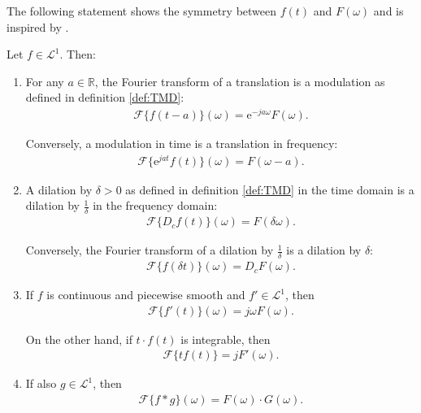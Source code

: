 \noindent
The following statement shows the symmetry between $f(t)$ and $F(\omega)$ and is inspired by \cite{page 214, FAA}.

\begin{theorem} \label{theorem:fund_sym_Fourier}
Let $f \in \mathcal{L}^1$. Then:

\begin{enumerate}[label=(\alph*)]
\item For any $a \in \mathbb{R}$, the Fourier transform of a translation is a modulation as defined in definition \ref{def:TMD}: \label{theorem:fund_sym_Fourier_a}
\begin{align*}
\mathcal{F}\{f(t-a)\}(\omega) = \text{e}^{-ja\omega} F(\omega).
\end{align*}

Conversely, a modulation in time is a translation in frequency:
\begin{align*}
\mathcal{F}\{\text{e}^{jat}f(t)\}(\omega) = F(\omega - a).
\end{align*}

\item A dilation by $\delta > 0$ as defined in definition \ref{def:TMD} in the time domain is a dilation by $\frac{1}{\delta}$ in the frequency domain:
\label{theorem:fund_sym_Fourier_b}
\begin{align*}
\mathcal{F}\{D_c f(t)\}(\omega) = F(\delta\omega).
\end{align*}

Conversely, the Fourier transform of a dilation by $\frac{1}{\delta}$ is a dilation by $\delta$:
\begin{align*}
\mathcal{F}\{f(\delta t)\}(\omega) = D_c F(\omega).
\end{align*}

\item If $f$ is continuous and piecewise smooth and $f' \in \mathcal{L}^1$, then
\begin{align*}
\mathcal{F}\{f'(t)\}(\omega) = j\omega F(\omega).
\end{align*}

On the other hand, if $t\cdot f(t)$ is integrable, then
\begin{align*}
\mathcal{F}\{tf(t)\} = j F'(\omega).
\end{align*}

\item If also $g \in \mathcal{L}^1$, then
\begin{align*}
\mathcal{F}\{f*g\}(\omega) = F(\omega) \cdot G(\omega).
\end{align*}
\end{enumerate}
\end{theorem}

